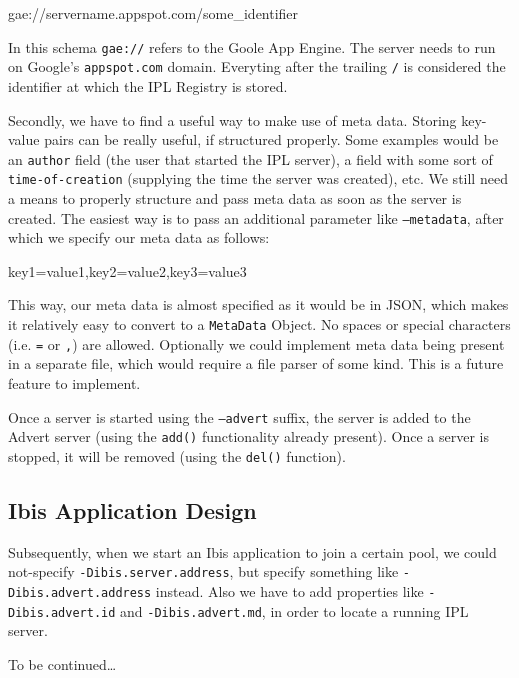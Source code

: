 \begin{center}
\begin{code}
gae://servername.appspot.com/some_identifier
\end{code}
\end{center}

In this schema \texttt{gae://} refers to the Goole App Engine. The server needs
to run on Google's \texttt{appspot.com} domain. Everyting after the trailing
\texttt{/} is considered the identifier at which the IPL Registry is stored.

Secondly, we have to find a useful way to make use of meta data. Storing
key-value pairs can be really useful, if structured properly. Some examples
would be an \texttt{author} field (the user that started the IPL server), a
field with some sort of \texttt{time-of-creation} (supplying the time the
server was created), etc. We still need a means to properly structure
and pass meta data as soon as the server is created. The easiest way is to pass
an additional parameter like \texttt{--metadata}, after which we specify our
meta data as follows:

\begin{center}
\begin{code}
key1=value1,key2=value2,key3=value3
\end{code}
\end{center}

This way, our meta data is almost specified as it would be in JSON, which makes
it relatively easy to convert to a \texttt{MetaData} Object. No spaces or
special characters (i.e. \texttt{=} or \texttt{,}) are allowed. Optionally we
could implement meta data being present in a separate file, which would require a
file parser of some kind. This is a future feature to implement.

Once a server is started using the \texttt{--advert} suffix, the server is added
to the Advert server (using the \texttt{add()} functionality already present).
Once a server is stopped, it will be removed (using the \texttt{del()}
function).

\subsection{Ibis Application Design}
Subsequently, when we start an Ibis application to join a certain pool, we
could not-specify \texttt{-Dibis.server.address}, but specify something like
\texttt{-Dibis.advert.address} instead. Also we have to add properties
like \texttt{-Dibis.advert.id} and \texttt{-Dibis.advert.md}, in order to
locate a running IPL server.

To be continued\ldots


